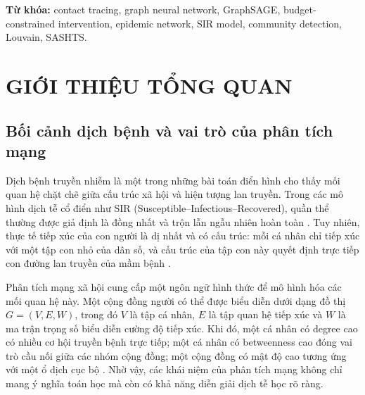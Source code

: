\documentclass[12pt,a4paper]{report}
\theoremstyle{definition}
\begin{document}
\vspace{6pt}
\noindent\textbf{Từ khóa:} contact tracing, graph neural network, GraphSAGE, budget-constrained intervention, epidemic network, SIR model, community detection, Louvain, SASHTS.

\tableofcontents
\clearpage

\listoftables
{}
\clearpage

\listoffigures
{}
\clearpage

\clearpage
{}
\setcounter{page}{1}

\chapter{GIỚI THIỆU TỔNG QUAN}

\section{Bối cảnh dịch bệnh và vai trò của phân tích mạng}

Dịch bệnh truyền nhiễm là một trong những bài toán điển hình cho thấy mối quan hệ chặt chẽ giữa cấu trúc xã hội và hiện tượng lan truyền. Trong các mô hình dịch tễ cổ điển như SIR (Susceptible--Infectious--Recovered), quần thể thường được giả định là đồng nhất và trộn lẫn ngẫu nhiên hoàn toàn \cite{kermack1927, keeling2005}. Tuy nhiên, thực tế tiếp xúc của con người là dị nhất và có cấu trúc: mỗi cá nhân chỉ tiếp xúc với một tập con nhỏ của dân số, và cấu trúc của tập con này quyết định trực tiếp con đường lan truyền của mầm bệnh \cite{watts1998, barabasi1999, pastorSatorras2001}.

Phân tích mạng xã hội cung cấp một ngôn ngữ hình thức để mô hình hóa các mối quan hệ này. Một cộng đồng người có thể được biểu diễn dưới dạng đồ thị $G=(V,E,W)$, trong đó $V$ là tập cá nhân, $E$ là tập quan hệ tiếp xúc và $W$ là ma trận trọng số biểu diễn cường độ tiếp xúc. Khi đó, một cá nhân có degree cao có nhiều cơ hội truyền bệnh trực tiếp; một cá nhân có betweenness cao đóng vai trò cầu nối giữa các nhóm cộng đồng; một cộng đồng có mật độ cao tương ứng với một ổ dịch cục bộ \cite{freeman1977, newman2006}. Nhờ vậy, các khái niệm của phân tích mạng không chỉ mang ý nghĩa toán học mà còn có khả năng diễn giải dịch tễ học rõ ràng.
\end{document}
